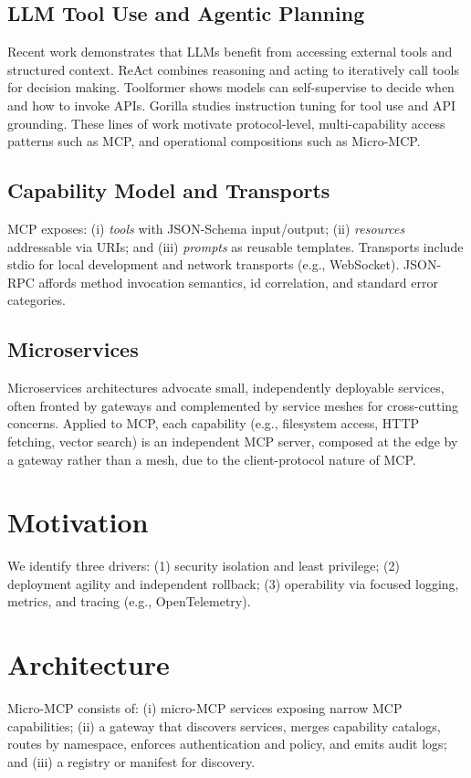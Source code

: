 \documentclass[conference]{IEEEtran}
\begin{document}
\subsection{LLM Tool Use and Agentic Planning}
Recent work demonstrates that LLMs benefit from accessing external tools and structured context. ReAct combines reasoning and acting to iteratively call tools for decision making\cite{react}. Toolformer shows models can self-supervise to decide when and how to invoke APIs\cite{toolformer}. Gorilla studies instruction tuning for tool use and API grounding\cite{gorilla}. These lines of work motivate protocol-level, multi-capability access patterns such as MCP, and operational compositions such as Micro-MCP.

\subsection{Capability Model and Transports}
MCP exposes: (i) \emph{tools} with JSON-Schema\cite{jsonschema} input/output; (ii) \emph{resources} addressable via URIs; and (iii) \emph{prompts} as reusable templates. Transports include stdio for local development and network transports (e.g., WebSocket\cite{rfc6455}). JSON-RPC affords method invocation semantics, id correlation, and standard error categories.

\subsection{Microservices}
Microservices architectures advocate small, independently deployable services, often fronted by gateways and complemented by service meshes for cross-cutting concerns. Applied to MCP, each capability (e.g., filesystem access, HTTP fetching, vector search) is an independent MCP server, composed at the edge by a gateway rather than a mesh, due to the client-protocol nature of MCP.

\section{Motivation}
We identify three drivers: (1) security isolation and least privilege; (2) deployment agility and independent rollback; (3) operability via focused logging, metrics, and tracing (e.g., OpenTelemetry\cite{otel}).

\section{Architecture}
Micro-MCP consists of: (i) micro-MCP services exposing narrow MCP capabilities; (ii) a gateway that discovers services, merges capability catalogs, routes by namespace, enforces authentication and policy, and emits audit logs; and (iii) a registry or manifest for discovery.
\end{document}
